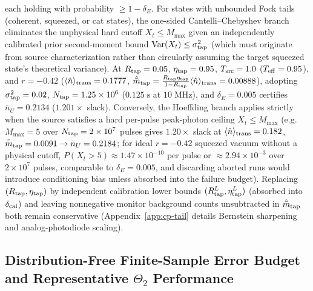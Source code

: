 \documentclass{iopjournal}
\newcommand{\nU}{\bar n_U}
\begin{document}
each holding with probability $\ge 1 - \delta_E$. For states with unbounded Fock tails (coherent, squeezed, or cat states), the one-sided Cantelli--Chebyshev branch eliminates the unphysical hard cutoff $X_t \le M_{\max}$ given an independently calibrated prior second-moment bound $\operatorname{Var}(X_t) \le \sigma_{\rm tap}^2$ (which must originate from source characterization rather than circularly assuming the target squeezed state's theoretical variance). At $R_{\rm tap} = 0.05$, $\eta_{\rm tap} = 0.95$, $T_{\rm src} = 1.0$ ($T_{\rm eff} = 0.95$), and $r = -0.42$ ($\langle\hat n\rangle_{\rm trans} = 0.1777$, $\hat{\bar m}_{\rm tap} = \frac{R_{\rm tap}\eta_{\rm tap}}{1 - R_{\rm tap}}\langle\hat n\rangle_{\rm trans} = 0.00888$), adopting $\sigma_{\rm tap}^2 = 0.02$, $N_{\rm tap} = 1.25 \times 10^6$ ($0.125\;\mathrm{s}$ at $10\;\mathrm{MHz}$), and $\delta_E = 0.005$ certifies $\nU = 0.2134$ ($1.201\times$ slack). Conversely, the Hoeffding branch applies strictly when the source satisfies a hard per-pulse peak-photon ceiling $X_t \le M_{\max}$ (e.g.\ $M_{\max} = 5$ over $N_{\rm tap} = 2 \times 10^7$ pulses gives $1.20\times$ slack at $\langle\hat n\rangle_{\rm trans}=0.182$, $\hat{\bar m}_{\rm tap}=0.0091 \to \nU = 0.2184$; for ideal $r=-0.42$ squeezed vacuum without a physical cutoff, $P(X_t > 5) \approx 1.47\times 10^{-10}$ per pulse or $\approx 2.94\times 10^{-3}$ over $2\times 10^7$ pulses, comparable to $\delta_E = 0.005$, and discarding aborted runs would introduce conditioning bias unless absorbed into the failure budget). Replacing $(R_{\rm tap}, \eta_{\rm tap})$ by independent calibration lower bounds $(R_{\rm tap}^L, \eta_{\rm tap}^L)$ (absorbed into $\delta_{\rm cal}$) and leaving nonnegative monitor background counts unsubtracted in $\hat{\bar m}_{\rm tap}$ both remain conservative (Appendix~\ref{app:cp-tail} details Bernstein sharpening and analog-photodiode scaling).

\subsection{Distribution-Free Finite-Sample Error Budget and Representative \texorpdfstring{$\Theta_2$}{Theta2} Performance}\label{subsec:stats-budget}
\end{document}
